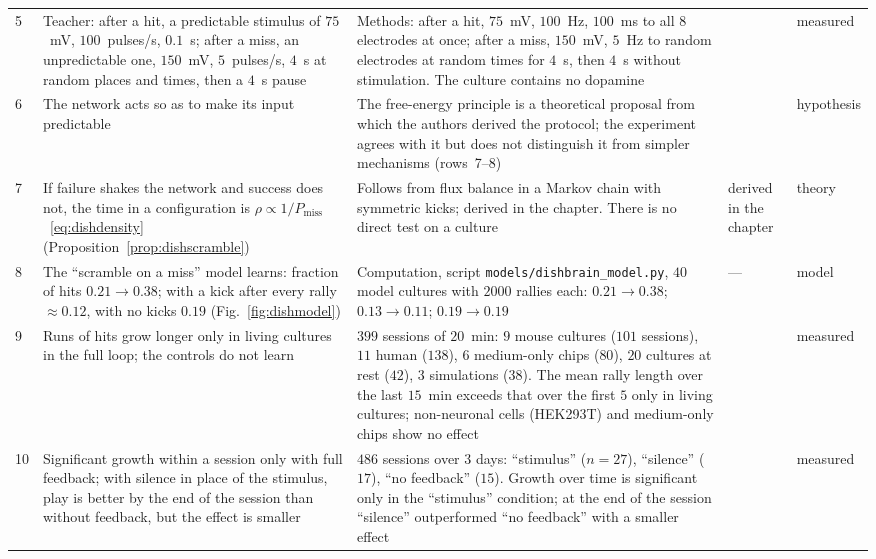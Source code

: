 {\begin{longtable}{>{\raggedright}p{0.5cm}>{\raggedright}p{4.0cm}>{\raggedright}p{5.6cm}>{\raggedright}p{2.3cm}>{\raggedright\arraybackslash}p{1.7cm}}
5 & Teacher: after a hit, a predictable stimulus of $75$~mV, $100$~pulses/s, $0.1$~s; after a miss, an unpredictable one, $150$~mV, $5$~pulses/s, $4$~s at random places and times, then a $4$~s pause & Methods: after a hit, $75$~mV, $100$~Hz, $100$~ms to all $8$ electrodes at once; after a miss, $150$~mV, $5$~Hz to random electrodes at random times for $4$~s, then $4$~s without stimulation. The culture contains no dopamine & \cite{Kagan2022} & measured \\
6 & The network acts so as to make its input predictable & The free-energy principle is a theoretical proposal from which the authors derived the protocol; the experiment agrees with it but does not distinguish it from simpler mechanisms (rows~7--8) & \cite{Friston2010,Kagan2022} & hypothesis \\
7 & If failure shakes the network and success does not, the time in a configuration is $\rho\propto1/P_{\text{miss}}$~\eqref{eq:dishdensity} (Proposition~\ref{prop:dishscramble}) & Follows from flux balance in a Markov chain with symmetric kicks; derived in the chapter. There is no direct test on a culture & derived in the chapter & theory \\
8 & The ``scramble on a miss'' model learns: fraction of hits $0.21\to0.38$; with a kick after every rally $\approx0.12$, with no kicks $0.19$ (Fig.~\ref{fig:dishmodel}) & Computation, script \texttt{models/dishbrain\_model.py}, $40$ model cultures with $2000$ rallies each: $0.21\to0.38$; $0.13\to0.11$; $0.19\to0.19$ & --- & model \\
9 & Runs of hits grow longer only in living cultures in the full loop; the controls do not learn & $399$ sessions of $20$~min: $9$ mouse cultures ($101$ sessions), $11$ human ($138$), $6$ medium-only chips ($80$), $20$ cultures at rest ($42$), $3$ simulations ($38$). The mean rally length over the last $15$~min exceeds that over the first $5$ only in living cultures; non-neuronal cells (HEK293T) and medium-only chips show no effect & \cite{Kagan2022} & measured \\
10 & Significant growth within a session only with full feedback; with silence in place of the stimulus, play is better by the end of the session than without feedback, but the effect is smaller & $486$ sessions over $3$ days: ``stimulus'' ($n=27$), ``silence'' ($17$), ``no feedback'' ($15$). Growth over time is significant only in the ``stimulus'' condition; at the end of the session ``silence'' outperformed ``no feedback'' with a smaller effect & \cite{Kagan2022} & measured \\

\end{longtable}}
